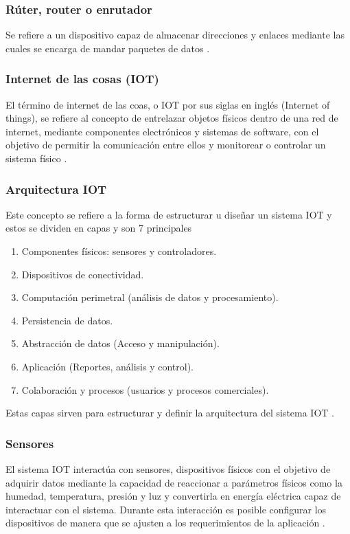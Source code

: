\documentclass[journal]{IEEEtran} %
\begin{document}
\subsubsection{Rúter, router o enrutador}
Se refiere a un dispositivo capaz de almacenar direcciones y enlaces mediante las cuales se encarga de mandar paquetes de datos \cite{RajKamal2017INTERNETPrinciples}.
\subsubsection{Internet de las cosas (IOT)}
El término de internet de las coas, o IOT por sus siglas en inglés (Internet of things), se refiere al concepto de entrelazar objetos físicos dentro de una red de internet, mediante componentes electrónicos y sistemas de software, con el objetivo de permitir la comunicación entre ellos y monitorear o controlar un sistema físico \cite{RajKamal2017INTERNETPrinciples}.
\subsubsection{Arquitectura IOT}
Este concepto se refiere a la forma de estructurar u diseñar un sistema IOT y estos se dividen en capas y son 7 principales
\begin{enumerate}
   \item Componentes físicos: sensores y controladores.
   \item Dispositivos de conectividad.
   \item Computación perimetral (análisis de datos y procesamiento).
   \item Persistencia de datos.
   \item Abstracción de datos (Acceso y manipulación).
   \item Aplicación (Reportes, análisis y control).
   \item Colaboración y procesos (usuarios y procesos comerciales). 
\end{enumerate}

Estas capas sirven para estructurar y definir la arquitectura del sistema IOT \cite{RajKamal2017INTERNETPrinciples}.

\subsubsection{Sensores}
El sistema IOT interactúa con sensores, dispositivos físicos con el objetivo de adquirir datos mediante la capacidad de reaccionar a parámetros físicos como la humedad, temperatura, presión y luz y convertirla en energía eléctrica capaz de interactuar con el sistema. Durante esta interacción es posible configurar los dispositivos de manera que se ajusten a los requerimientos de la aplicación \cite{RajKamal2017INTERNETPrinciples}.
\end{document}
